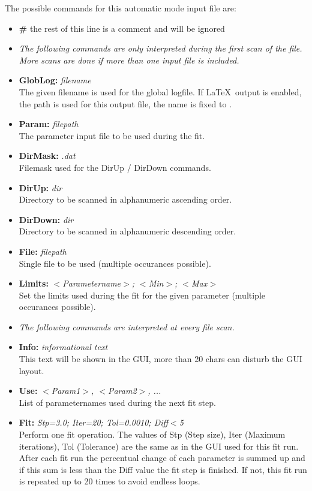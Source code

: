 \documentclass[11pt]{article} %
\begin{document}
The possible commands for this automatic mode input file are:
\begin{itemize}\itemsep0pt
\item {\bf \#} the rest of this line is a comment and will be ignored
\item[] {\it The following commands are only interpreted during the first scan of the file. More scans are done if more than one input file is included.}
\item {\bf GlobLog:} {\it filename} \\
	The given filename is used for the global logfile. If \LaTeX\  output is enabled, the path is used for this output file, the name is fixed to .
\item {\bf Param:} {\it filepath} \\
	The parameter input file to be used during the fit.
\item {\bf DirMask:} {\it *.dat} \\
	Filemask used for the DirUp / DirDown commands.
\item {\bf DirUp:} {\it dir} \\
	Directory to be scanned in alphanumeric ascending order.
\item {\bf DirDown:} {\it dir} \\
	Directory to be scanned in alphanumeric descending order.
\item {\bf File:} {\it filepath} \\
	Single file to be used (multiple occurances possible).
\item {\bf Limits:} {\it $<$Parametername$>$; $<$Min$>$; $<$Max$>$} \\
	Set the limits used during the fit for the given parameter (multiple occurances possible).
\item[] {\it The following commands are interpreted at every file scan.}
\item {\bf Info:} {\it informational text} \\
	This text will be shown in the GUI, more than 20 chars can disturb the GUI layout.
\item {\bf Use:} {\it $<$Param1$>$, $<$Param2$>$, ... } \\
	List of parameternames used during the next fit step.
\item {\bf Fit:} {\it Stp=3.0; Iter=20; Tol=0.0010; Diff$<$5} \\
	Perform one fit operation. The values of Stp (Step size), Iter (Maximum iterations), Tol (Tolerance) are the same as in the GUI used for this fit run. After each fit run the percentual change of each parameter is summed up and if this sum is less than the Diff value the fit step is finished. If not, this fit run is repeated up to 20 times to avoid endless loops.
\end{itemize}
\end{document}
